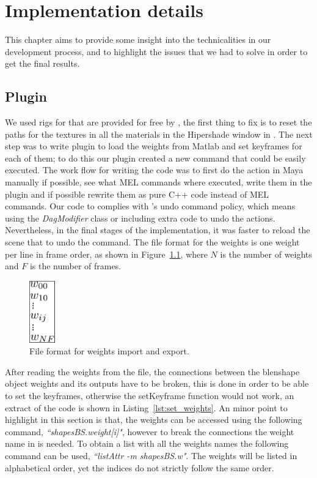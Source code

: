 \chapter{Implementation details}
\label{ch:implementation_details}

This chapter aims to provide some insight into the technicalities in our development process, and to highlight the issues that we had to solve in order to get the final results. 

\section{\Maya Plugin}
\label{sec:maya_plugin}

We used rigs for \Maya that are provided for free by \cite{FaceWareRigsWeb}, the first thing to fix is to reset the paths for the textures in all the materials in the Hipershade window in \Maya.
The next step was to write plugin to load the weights from Matlab and set keyframes for each of them; to do this our plugin created a new \Maya command that could be easily executed. 
The work flow for writing the code was to first do the action in Maya manually if possible, see what MEL commands where executed, write them in the plugin and if possible rewrite them as pure C++ code instead of MEL commands.
Our code to complies with \Maya's undo command policy, which means using the \emph{DagModifier} class or including extra code to undo the actions.
Nevertheless, in the final stages of the implementation, it was faster to reload the scene that to undo the command.
The file format for the weights is one weight per line in frame order, as shown in Figure~\ref{fig:file_format}, where $N$ is the number of weights and $F$ is the number of frames.

\begin{figure}[htbp!]
\centering
\includegraphics[width=0.1\textwidth]{img/file_format}
	\caption{File format for weights import and export.}
	\label{fig:file_format}
\end{figure}

After reading the weights  from the file, the connections between the blenshape object weights and its outputs have to be broken, this is done in order to be able to set the keyframes, otherwise the setKeyframe function would not work, an extract of the code is shown in Listing~\ref{lst:set_weights}.
An minor point to highlight in this section is that, the weights can be accessed using the following command, \textit{``shapesBS.weight[i]"}, however to break the connections the weight name in \Maya is needed.
To obtain a list with all the weights names the following command can be used, \textit{``listAttr -m shapesBS.w"}.
The weights will be listed in alphabetical order, yet the indices do not strictly follow the same order. 

